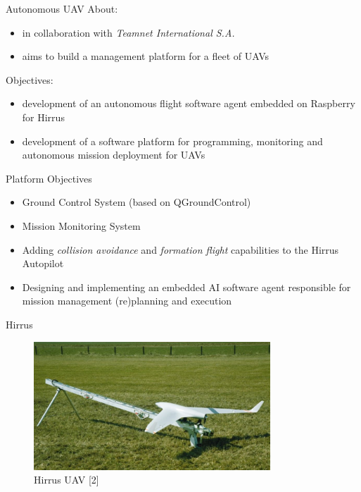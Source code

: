 \documentclass{beamer}
\begin{document}
\begin{frame}{Autonomous UAV}
About:
\begin{itemize}
\item in collaboration with \textit{Teamnet International S.A.}
\item aims to build a management platform for a fleet of UAVs
\end{itemize}
Objectives:
\begin{itemize}
\item development of an autonomous flight software agent embedded on Raspberry
for Hirrus
\item development of a software platform for programming, monitoring and autonomous mission deployment for UAVs
\end{itemize}
\end{frame}

\begin{frame}{Platform Objectives}
\begin{itemize}
\item Ground Control System (based on QGroundControl)
\item Mission Monitoring System
\item Adding \textit{collision avoidance} and \textit{formation flight} capabilities to the Hirrus Autopilot
\item Designing and implementing an embedded AI software agent responsible for mission management (re)planning and execution
\end{itemize}
\end{frame}

\begin{frame}{Hirrus}
\begin{center}
\begin{figure}[p]
\includegraphics[width=3.5in]{img/hirrus.jpg}
\caption{Hirrus UAV [2]}
\end{figure}
\end{center}
\end{frame}
\end{document}
